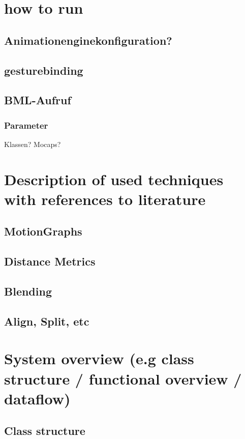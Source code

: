 \documentclass[a4paper,10pt]{scrartcl}
\let\stdsubsection\subsection
\renewcommand\subsection{\nopagebreak\stdsubsection}
\begin{document}
\tableofcontents

\section{how to run}

\subsection{Animationenginekonfiguration?}

\subsection{gesturebinding}

\subsection{BML-Aufruf}

\subsubsection{Parameter}
Klassen? Mocaps?


\section{Description of used techniques with references to literature}

\subsection{MotionGraphs}
\subsection{Distance Metrics}
\subsection{Blending}
\subsection{Align, Split, etc}

\section{System overview (e.g class structure / functional overview / dataflow)}

\subsection{Class structure}
\end{document}
